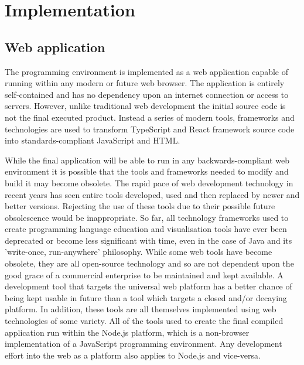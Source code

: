 \chapter{Implementation}

\section{Web application}

The programming environment is implemented as a web application capable of running within any modern or future web browser. The application is entirely self-contained and has no dependency upon an internet connection or access to servers. However, unlike traditional web development the initial source code is not the final executed product. Instead a series of modern tools, frameworks and technologies are used to transform TypeScript and React framework source code into standards-compliant JavaScript and HTML.

While the final application will be able to run in any backwards-compliant web environment it is possible that the tools and frameworks needed to modify and build it may become obsolete. The rapid pace of web development technology in recent years has seen entire tools developed, used and then replaced by newer and better versions. Rejecting the use of these tools due to their possible future obsolescence would be inappropriate. So far, all technology frameworks used to create programming language education and visualisation tools have ever been deprecated or become less significant with time, even in the case of Java and its 'write-once, run-anywhere' philosophy. While some web tools have become obsolete, they are all open-source technology and so are not dependent upon the good grace of a commercial enterprise to be maintained and kept available. A development tool that targets the universal web platform has a better chance of being kept usable in future than a tool which targets a closed and/or decaying platform. In addition, these tools are all themselves implemented using web technologies of some variety. All of the tools used to create the final compiled application run within the Node.js platform, which is a non-browser implementation of a JavaScript programming environment. Any development effort into the web as a platform also applies to Node.js and vice-versa.

